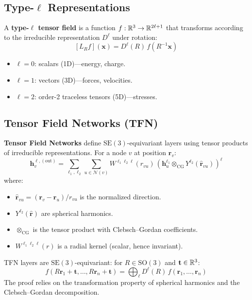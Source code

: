 \subsection{Type-$\ell$ Representations}

\begin{definition}
A \textbf{type-$\ell$ tensor field} is a function
$f: \mathbb{R}^3 \to \mathbb{R}^{2\ell+1}$ that transforms according to the irreducible
representation $D^\ell$ under rotation:
\[
    [L_R f](\mathbf{x}) = D^\ell(R)\, f(R^{-1}\mathbf{x})
\]
\begin{itemize}
    \item $\ell = 0$: scalars (1D)---energy, charge.
    \item $\ell = 1$: vectors (3D)---forces, velocities.
    \item $\ell = 2$: order-2 traceless tensors (5D)---stresses.
\end{itemize}
\end{definition}

\subsection{Tensor Field Networks (TFN)}

\begin{definition}
\textbf{Tensor Field Networks} define $\mathrm{SE}(3)$-equivariant layers
using tensor products of irreducible representations. For a node $v$ at
position $\mathbf{r}_v$:
\[
    \mathbf{h}_v^{\ell, (\text{out})} = \sum_{\ell_1, \ell_2}
    \sum_{u \in \mathcal{N}(v)} W^{\ell_1 \ell_2 \ell}(r_{vu})\,
    \left(\mathbf{h}_u^{\ell_1} \otimes_{\text{CG}} Y^{\ell_2}(\hat{\mathbf{r}}_{vu})\right)^\ell
\]
where:
\begin{itemize}
    \item $\hat{\mathbf{r}}_{vu} = (\mathbf{r}_v - \mathbf{r}_u) / r_{vu}$ is
          the normalized direction.
    \item $Y^{\ell_2}(\hat{\mathbf{r}})$ are spherical harmonics.
    \item $\otimes_{\text{CG}}$ is the tensor product with Clebsch--Gordan
          coefficients.
    \item $W^{\ell_1 \ell_2 \ell}(r)$ is a radial kernel (scalar, hence invariant).
\end{itemize}
\end{definition}

\begin{theorem}
TFN layers are $\mathrm{SE}(3)$-equivariant: for $R \in \mathrm{SO}(3)$ and
$\mathbf{t} \in \mathbb{R}^3$:
\[
    f(R\mathbf{r}_1 + \mathbf{t}, \ldots, R\mathbf{r}_n + \mathbf{t})
    = \bigoplus_\ell D^\ell(R)\, f(\mathbf{r}_1, \ldots, \mathbf{r}_n)
\]
The proof relies on the transformation property of spherical harmonics and
the Clebsch--Gordan decomposition.
\end{theorem}

